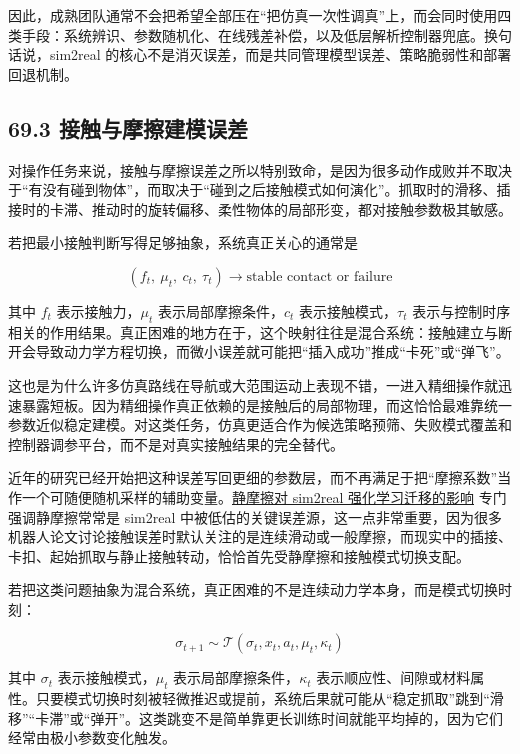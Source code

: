 因此，成熟团队通常不会把希望全部压在“把仿真一次性调真”上，而会同时使用四类手段：系统辨识、参数随机化、在线残差补偿，以及低层解析控制器兜底。换句话说，sim2real 的核心不是消灭误差，而是共同管理模型误差、策略脆弱性和部署回退机制。

\subsection*{69.3 接触与摩擦建模误差}


对操作任务来说，接触与摩擦误差之所以特别致命，是因为很多动作成败并不取决于“有没有碰到物体”，而取决于“碰到之后接触模式如何演化”。抓取时的滑移、插接时的卡滞、推动时的旋转偏移、柔性物体的局部形变，都对接触参数极其敏感。

若把最小接触判断写得足够抽象，系统真正关心的通常是

\begingroup
\footnotesize
\begin{equation*}
(f_t,\ \mu_t,\ c_t,\ \tau_t) \rightarrow \text{stable contact or failure}
\end{equation*}
\endgroup

其中 \(f_t\) 表示接触力，\(\mu_t\) 表示局部摩擦条件，\(c_t\) 表示接触模式，\(\tau_t\) 表示与控制时序相关的作用结果。真正困难的地方在于，这个映射往往是混合系统：接触建立与断开会导致动力学方程切换，而微小误差就可能把“插入成功”推成“卡死”或“弹飞”。

这也是为什么许多仿真路线在导航或大范围运动上表现不错，一进入精细操作就迅速暴露短板。因为精细操作真正依赖的是接触后的局部物理，而这恰恰最难靠统一参数近似稳定建模。对这类任务，仿真更适合作为候选策略预筛、失败模式覆盖和控制器调参平台，而不是对真实接触结果的完全替代。

近年的研究已经开始把这种误差写回更细的参数层，而不再满足于把“摩擦系数”当作一个可随便随机采样的辅助变量。\href{https://arxiv.org/abs/2503.01255}{静摩擦对 sim2real 强化学习迁移的影响} 专门强调静摩擦常常是 sim2real 中被低估的关键误差源，这一点非常重要，因为很多机器人论文讨论接触误差时默认关注的是连续滑动或一般摩擦，而现实中的插接、卡扣、起始抓取与静止接触转动，恰恰首先受静摩擦和接触模式切换支配。

若把这类问题抽象为混合系统，真正困难的不是连续动力学本身，而是模式切换时刻：

\begingroup
\footnotesize
\begin{equation*}
\sigma_{t+1} \sim \mathcal{T}(\sigma_t, x_t, a_t, \mu_t, \kappa_t)
\end{equation*}
\endgroup

其中 \(\sigma_t\) 表示接触模式，\(\mu_t\) 表示局部摩擦条件，\(\kappa_t\) 表示顺应性、间隙或材料属性。只要模式切换时刻被轻微推迟或提前，系统后果就可能从“稳定抓取”跳到“滑移”“卡滞”或“弹开”。这类跳变不是简单靠更长训练时间就能平均掉的，因为它们经常由极小参数变化触发。

